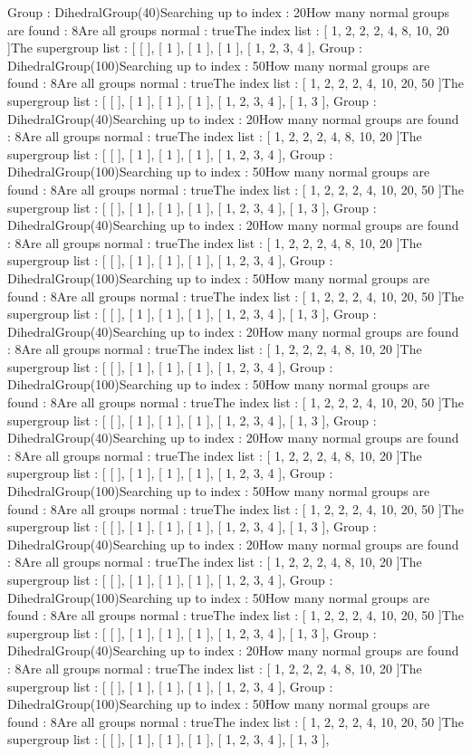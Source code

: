 Group : DihedralGroup(40)Searching up to index : 20How many normal groups are found : 8Are all groups normal : trueThe index list : [ 1, 2, 2, 2, 4, 8, 10, 20 ]The supergroup list : [ [  ], [ 1 ], [ 1 ], [ 1 ], [ 1, 2, 3, 4 ],
Group : DihedralGroup(100)Searching up to index : 50How many normal groups are found : 8Are all groups normal : trueThe index list : [ 1, 2, 2, 2, 4, 10, 20, 50 ]The supergroup list : [ [  ], [ 1 ], [ 1 ], [ 1 ], [ 1, 2, 3, 4 ], [ 1, 3 ],
Group : DihedralGroup(40)Searching up to index : 20How many normal groups are found : 8Are all groups normal : trueThe index list : [ 1, 2, 2, 2, 4, 8, 10, 20 ]The supergroup list : [ [  ], [ 1 ], [ 1 ], [ 1 ], [ 1, 2, 3, 4 ],
Group : DihedralGroup(100)Searching up to index : 50How many normal groups are found : 8Are all groups normal : trueThe index list : [ 1, 2, 2, 2, 4, 10, 20, 50 ]The supergroup list : [ [  ], [ 1 ], [ 1 ], [ 1 ], [ 1, 2, 3, 4 ], [ 1, 3 ],
Group : DihedralGroup(40)Searching up to index : 20How many normal groups are found : 8Are all groups normal : trueThe index list : [ 1, 2, 2, 2, 4, 8, 10, 20 ]The supergroup list : [ [  ], [ 1 ], [ 1 ], [ 1 ], [ 1, 2, 3, 4 ],
Group : DihedralGroup(100)Searching up to index : 50How many normal groups are found : 8Are all groups normal : trueThe index list : [ 1, 2, 2, 2, 4, 10, 20, 50 ]The supergroup list : [ [  ], [ 1 ], [ 1 ], [ 1 ], [ 1, 2, 3, 4 ], [ 1, 3 ],
Group : DihedralGroup(40)Searching up to index : 20How many normal groups are found : 8Are all groups normal : trueThe index list : [ 1, 2, 2, 2, 4, 8, 10, 20 ]The supergroup list : [ [  ], [ 1 ], [ 1 ], [ 1 ], [ 1, 2, 3, 4 ],
Group : DihedralGroup(100)Searching up to index : 50How many normal groups are found : 8Are all groups normal : trueThe index list : [ 1, 2, 2, 2, 4, 10, 20, 50 ]The supergroup list : [ [  ], [ 1 ], [ 1 ], [ 1 ], [ 1, 2, 3, 4 ], [ 1, 3 ],
Group : DihedralGroup(40)Searching up to index : 20How many normal groups are found : 8Are all groups normal : trueThe index list : [ 1, 2, 2, 2, 4, 8, 10, 20 ]The supergroup list : [ [  ], [ 1 ], [ 1 ], [ 1 ], [ 1, 2, 3, 4 ],
Group : DihedralGroup(100)Searching up to index : 50How many normal groups are found : 8Are all groups normal : trueThe index list : [ 1, 2, 2, 2, 4, 10, 20, 50 ]The supergroup list : [ [  ], [ 1 ], [ 1 ], [ 1 ], [ 1, 2, 3, 4 ], [ 1, 3 ],
Group : DihedralGroup(40)Searching up to index : 20How many normal groups are found : 8Are all groups normal : trueThe index list : [ 1, 2, 2, 2, 4, 8, 10, 20 ]The supergroup list : [ [  ], [ 1 ], [ 1 ], [ 1 ], [ 1, 2, 3, 4 ],
Group : DihedralGroup(100)Searching up to index : 50How many normal groups are found : 8Are all groups normal : trueThe index list : [ 1, 2, 2, 2, 4, 10, 20, 50 ]The supergroup list : [ [  ], [ 1 ], [ 1 ], [ 1 ], [ 1, 2, 3, 4 ], [ 1, 3 ],
Group : DihedralGroup(40)Searching up to index : 20How many normal groups are found : 8Are all groups normal : trueThe index list : [ 1, 2, 2, 2, 4, 8, 10, 20 ]The supergroup list : [ [  ], [ 1 ], [ 1 ], [ 1 ], [ 1, 2, 3, 4 ],
Group : DihedralGroup(100)Searching up to index : 50How many normal groups are found : 8Are all groups normal : trueThe index list : [ 1, 2, 2, 2, 4, 10, 20, 50 ]The supergroup list : [ [  ], [ 1 ], [ 1 ], [ 1 ], [ 1, 2, 3, 4 ], [ 1, 3 ],
